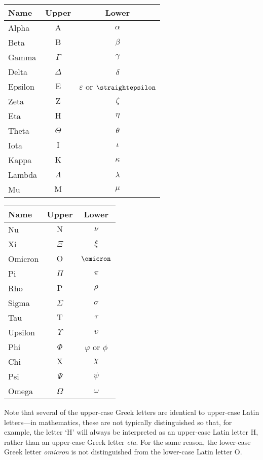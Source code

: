 \begin{center}
\begin{tabular}{l|cc}
\textbf{Name} & \textbf{Upper} & \textbf{Lower}  \\ \hline
\small Alpha   & $\mathrm{A}$ & $\alpha$ \\
\small Beta    & $\mathrm{B}$ & $\beta$ \\
\small Gamma   & $\Gamma$     & $\gamma$ \\
\small Delta   & $\Delta$     & $\delta$ \\
\small Epsilon & $\mathrm{E}$ & $\varepsilon$ or $\text{\straightepsilon}$ \\
\small Zeta    & $\mathrm{Z}$ & $\zeta$ \\
\small Eta     & $\mathrm{H}$ & $\eta$ \\
\small Theta   & $\Theta$     & $\theta$ \\
\small Iota    & $\mathrm{I}$ & $\iota$ \\
\small Kappa   & $\mathrm{K}$ & $\kappa$ \\
\small Lambda  & $\Lambda$    & $\lambda$ \\
\small Mu      & $\mathrm{M}$ & $\mu$ 
\end{tabular}
%
\hspace{20pt}
%
\begin{tabular}{l|cc}
\textbf{Name} & \textbf{Upper} & \textbf{Lower}  \\ \hline
\small Nu      & $\mathrm{N}$ & $\nu$ \\
\small Xi      & $\Xi$        & $\xi$ \\
\small Omicron & $\mathrm{O}$ & $\omicron$ \\
\small Pi      & $\Pi$        & $\pi$ \\
\small Rho     & $\mathrm{P}$ & $\rho$ \\
\small Sigma   & $\Sigma$     & $\sigma$ \\
\small Tau     & $\mathrm{T}$ & $\tau$ \\
\small Upsilon & $\Upsilon$   & $\upsilon$ \\
\small Phi     & $\Phi$       & $\varphi$ or $\phi$ \\
\small Chi     & $\mathrm{X}$ & $\chi$ \\
\small Psi     & $\Psi$       & $\psi$ \\
\small Omega   & $\Omega$     & $\omega$
\end{tabular}
\end{center}

Note that several of the upper-case Greek letters are identical to upper-case Latin letters---in mathematics, these are not typically distinguished so that, for example, the letter `H' will always be interpreted as an upper-case Latin letter H, rather than an upper-case Greek letter \textit{eta}. For the same reason, the lower-case Greek letter \textit{omicron} is not distinguished from the lower-case Latin letter O.

